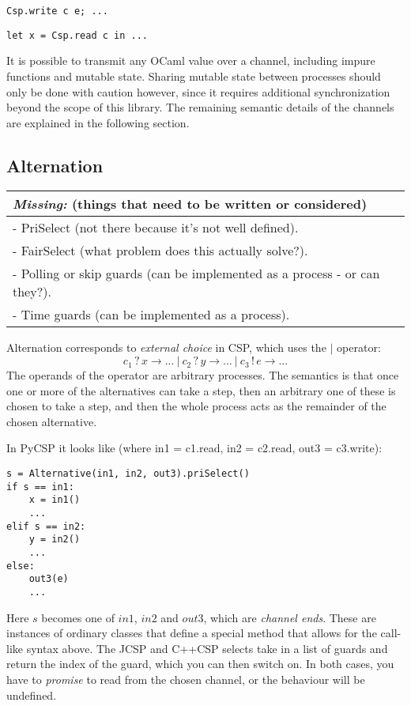 \documentclass[a4paper,12pt]{article}
\newcommand{\missing}[1]{
  \begin{tabular}{|p{11cm}|}
    \hline
    \emph{Missing:} {\scriptsize (things that need to be written or considered)} \\
    \hline
    #1
    \hline
  \end{tabular}
}
\begin{document}
\begin{verbatim}
Csp.write c e; ...
\end{verbatim}
\begin{verbatim}
let x = Csp.read c in ...
\end{verbatim}

It is possible to transmit any OCaml value over a channel, including impure functions and mutable 
state. Sharing mutable state between processes should only be done with caution however, since it 
requires additional synchronization beyond the scope of this library. The remaining semantic 
details of the channels are explained in the following section.

\subsection{Alternation}
\missing{
- PriSelect (not there because it's not well defined).\\
- FairSelect (what problem does this actually solve?).\\
- Polling or skip guards (can be implemented as a process - or can they?). \\
- Time guards (can be implemented as a process). \\
}

Alternation corresponds to \emph{external choice} in CSP, which uses the $|$ operator:
\[c_1\,?\,x \to ...\ |\ c_2\,?\,y \to ...\ |\ c_3\,!\,e \to ...\]
The operands of the operator are arbitrary processes. The semantics is that once one or 
more of the alternatives can take a step, then an arbitrary one of these is chosen to take a 
step, and then the whole process acts as the remainder of the chosen alternative.

In PyCSP it looks like (where in1 = c1.read, in2 = c2.read, out3 = c3.write):
\begin{verbatim}
s = Alternative(in1, in2, out3).priSelect()
if s == in1:
    x = in1()
    ...
elif s == in2:
    y = in2()
    ...
else:
    out3(e)
    ...
\end{verbatim}
Here $s$ becomes one of $in1$, $in2$ and $out3$, which are \emph{channel ends}. These are instances
of ordinary classes that define a special method that allows for the call-like syntax above.
The JCSP and C++CSP selects take in a list of guards and return the index of the guard, which you can 
then switch on. In both cases, you have to \emph{promise} to read from the chosen channel, or the 
behaviour will be undefined.
\end{document}
